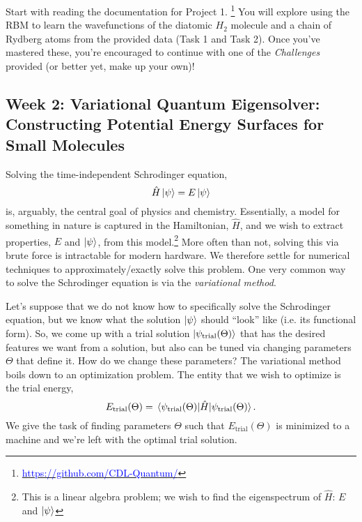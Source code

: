\documentclass[12pt]{article}
\begin{document}
Start with reading the documentation for Project 1.
\footnote{\href{https://github.com/CDL-Quantum/CohortProject_2020/tree/master/Project_1_RBM_and_Tomography}
    {\textcolor{blue}{https://github.com/CDL-Quantum/}}}
You will explore using the RBM to learn the wavefunctions of the diatomic $H_2$ molecule
and a chain of Rydberg atoms from the provided data (Task 1 and Task 2).
Once you've mastered these, you're encouraged to continue with one of the {\it Challenges} provided (or better yet, make up your own)!

\newpage


\subsection{Week 2: Variational Quantum Eigensolver: Constructing Potential Energy Surfaces for Small Molecules}

Solving the time-independent Schrodinger equation,
\begin{equation}
    \hat{H}\ket{\psi} = E\ket{\psi}
\end{equation}
is, arguably, the central goal of physics and chemistry. Essentially, a model for something in nature is captured in the Hamiltonian, $\hat{H}$, and we wish to extract properties, $E$ and $\ket{\psi}$, from this model.\footnote{This is a linear algebra problem; we wish to find the eigenspectrum of $\hat{H}$: $E$ and $\ket{\psi}$} More often than not, solving this via brute force is intractable for modern hardware. We therefore settle for numerical techniques to approximately/exactly solve this problem. One very common way to solve the Schrodinger equation is via the {\it variational method}.

Let's suppose that we do not know how to specifically solve the Schrodinger equation, but we know what the solution $\ket{\psi}$ should ``look'' like (i.e. its functional form).
So, we come up with a trial solution $\ket{\psi_{\text{trial}}(\Theta)}$ that has the desired features we want from a solution, but also can be tuned via changing parameters $\Theta$ that define it.
How do we change these parameters?
The variational method boils down to an optimization problem. 
The entity that we wish to optimize is the trial energy,
\begin{equation}
    E_{\text{trial}}(\Theta) = \mel{\psi_{\text{trial}}(\Theta)}{\hat{H}}{\psi_{\text{trial}}(\Theta)}.
\end{equation}
We give the task of finding parameters $\Theta$ such that $E_{\text{trial}}(\Theta)$ is minimized to a machine and we're left with the optimal trial solution.
\end{document}
